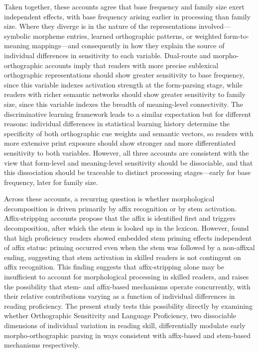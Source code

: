 Taken together, these accounts agree that base frequency and family size exert independent effects, with base frequency arising earlier in processing than family size. Where they diverge is in the nature of the representations involved---symbolic morpheme entries, learned orthographic patterns, or weighted form-to-meaning mappings---and consequently in how they explain the source of individual differences in sensitivity to each variable. Dual-route and morpho-orthographic accounts imply that readers with more precise sublexical orthographic representations should show greater sensitivity to base frequency, since this variable indexes activation strength at the form-parsing stage, while readers with richer semantic networks should show greater sensitivity to family size, since this variable indexes the breadth of meaning-level connectivity. The discriminative learning framework leads to a similar expectation but for different reasons: individual differences in statistical learning history determine the specificity of both orthographic cue weights and semantic vectors, so readers with more extensive print exposure should show stronger and more differentiated sensitivity to both variables. However, all three accounts are consistent with the view that form-level and meaning-level sensitivity should be dissociable, and that this dissociation should be traceable to distinct processing stages---early for base frequency, later for family size.

Across these accounts, a recurring question is whether morphological decomposition is driven primarily by affix recognition or by stem activation. Affix-stripping accounts \citep{taft_lexical_1975, rastleMorphologicalDecompositionBased2008} propose that the affix is identified first and triggers decomposition, after which the stem is looked up in the lexicon. However, \citet{beyersmannEmbeddedStemPriming2016} found that high proficiency readers showed embedded stem priming effects independent of affix status: priming occurred even when the stem was followed by a non-affixal ending, suggesting that stem activation in skilled readers is not contingent on affix recognition. This finding suggests that affix-stripping alone may be insufficient to account for morphological processing in skilled readers, and raises the possibility that stem- and affix-based mechanisms operate concurrently, with their relative contributions varying as a function of individual differences in reading proficiency. The present study tests this possibility directly by examining whether Orthographic Sensitivity and Language Proficiency, two dissociable dimensions of individual variation in reading skill, differentially modulate early morpho-orthographic parsing in ways consistent with affix-based and stem-based mechanisms respectively.


